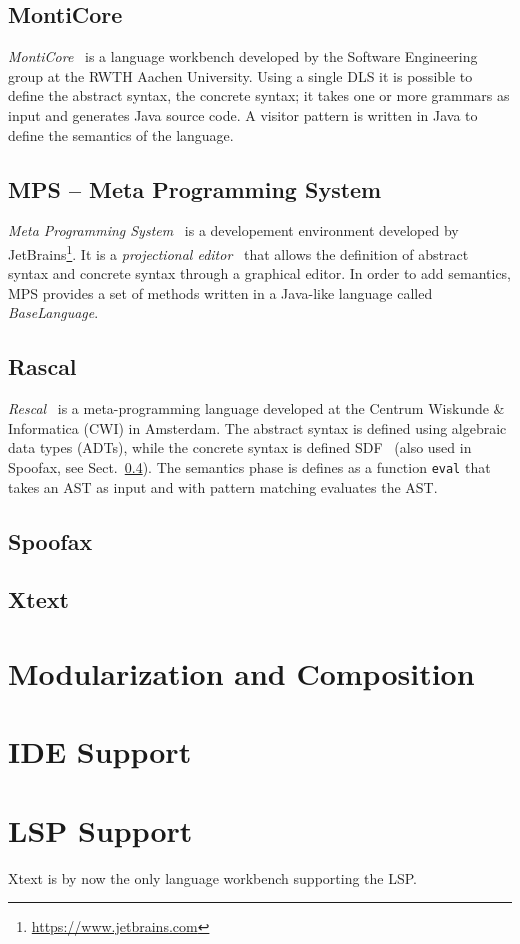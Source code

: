 \subsection{MontiCore}\label{subsec:background:monticore}
\textit{MontiCore}~\cite{Krahn10} is a language workbench developed by the Software Engineering group at the RWTH Aachen University. Using a single DLS it is possible to define the abstract syntax, the concrete syntax; it takes one or more grammars as input and generates Java source code.
A visitor pattern is written in Java to define the semantics of the language.

\subsection{MPS -- Meta Programming System}\label{subsec:background:mps}
\textit{Meta Programming System}~\cite{Volter11, Voelter12} is a developement environment developed by JetBrains\footnote{\url{https://www.jetbrains.com}}. It is a \textit{projectional editor}~\cite{Voelter14} that allows the definition of abstract syntax and concrete syntax through a graphical editor. In order to add semantics, MPS provides a set of methods written in a Java-like language called \textit{BaseLanguage}.

\subsection{Rascal}\label{subsec:background:rascal}

\textit{Rescal}~\cite{Klint09b} is a meta-programming language developed at the Centrum Wiskunde \& Informatica (CWI) in Amsterdam. The abstract syntax is defined using algebraic data types (ADTs), while the concrete syntax is defined SDF~\cite{Heering89c} (also used in Spoofax, see Sect.~\ref{subsec:background:spoofax}). The semantics phase is defines as a function \texttt{eval} that takes an AST as input and with pattern matching evaluates the AST.

\subsection{Spoofax}\label{subsec:background:spoofax}

\subsection{Xtext}\label{subsec:background:xtext}


\section{Modularization and Composition}\label{sec:background:modularization}


\section{IDE Support}\label{sec:background:ide-support}

\section{LSP Support}\label{sec:background:lsp-support}
Xtext is by now the only language workbench supporting the LSP.~\cite{Bunder19a}






